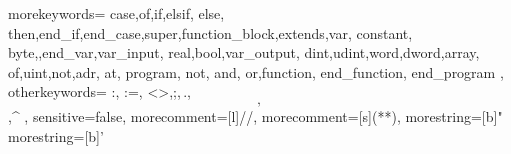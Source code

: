 \usepackage[dvipsnames]{xcolor}

{ 
   morekeywords={ 
      case,of,if,elsif, else, then,end_if,end_case,super,function_block,extends,var, 
      constant, byte,,end_var,var_input, real,bool,var_output, 
      dint,udint,word,dword,array, of,uint,not,adr, at, program, not, and, or,function, end_function, end_program
   }, 
   otherkeywords={ 
      :, :=, <>,;,\,.,\[,\],\^ 
   }, 
   sensitive=false, 
   morecomment=[l]{//}, 
   morecomment=[s]{(*}{*)}, 
   morestring=[b]" 
   morestring=[b]'   
} 

